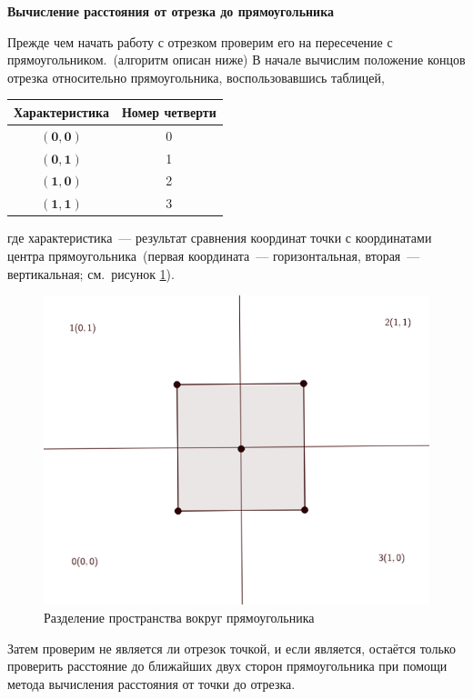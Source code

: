 \textbf{Вычисление расстояния от отрезка до прямоугольника}

Прежде чем начать работу с отрезком проверим его на пересечение с прямоугольником.~(алгоритм описан ниже)
В начале вычислим положение концов отрезка относительно прямоугольника, воспользовавшись таблицей,
\begin{center}
\begin{tabular}{|c|c|}
\hline
Характеристика & Номер четверти \\
\hline 
$(\mathbf{0},\mathbf{0})$ & 0 \\ 
\hline 
$(\mathbf{0},\mathbf{1})$ & 1 \\
\hline
$(\mathbf{1},\mathbf{0})$ & 2 \\
\hline
$(\mathbf{1},\mathbf{1})$ & 3 \\
\hline
\end{tabular} 
\end{center}
где характеристика~--- результат сравнения координат точки с  координатами центра прямоугольника~(первая координата~--- горизонтальная, вторая~--- вертикальная; см.~рисунок \ref{fig:conv_rect}).
\begin{figure}[ht!]
\begin{center}
\includegraphics[scale=0.4]{images/conv_rect}
\end{center}
\vspace*{-8mm}
\caption{Разделение пространства вокруг прямоугольника}\label{fig:conv_rect}
\end{figure}

Затем проверим  не является ли отрезок точкой, и если является, остаётся только проверить расстояние до ближайших двух сторон прямоугольника при помощи метода вычисления расстояния от точки до отрезка.

